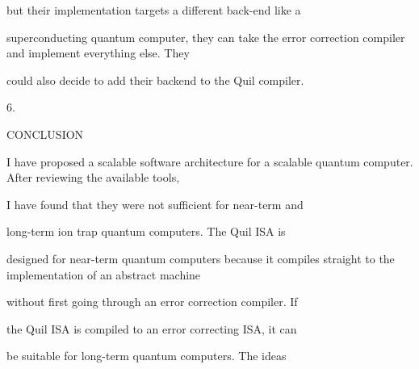 \documentclass[a4paper,portrait,12pt]{article}
\begin{document}
\begin{flushleft}
but their implementation targets a different back-end like a
\end{flushleft}


\begin{flushleft}
superconducting quantum computer, they can take the error correction compiler and implement everything else. They
\end{flushleft}


\begin{flushleft}
could also decide to add their backend to the Quil compiler.
\end{flushleft}





6.





\begin{flushleft}
CONCLUSION
\end{flushleft}





\begin{flushleft}
I have proposed a scalable software architecture for a scalable quantum computer. After reviewing the available tools,
\end{flushleft}


\begin{flushleft}
I have found that they were not sufficient for near-term and
\end{flushleft}


\begin{flushleft}
long-term ion trap quantum computers. The Quil ISA is
\end{flushleft}


\begin{flushleft}
designed for near-term quantum computers because it compiles straight to the implementation of an abstract machine
\end{flushleft}


\begin{flushleft}
without first going through an error correction compiler. If
\end{flushleft}


\begin{flushleft}
the Quil ISA is compiled to an error correcting ISA, it can
\end{flushleft}


\begin{flushleft}
be suitable for long-term quantum computers. The ideas
\end{flushleft}
\end{document}
